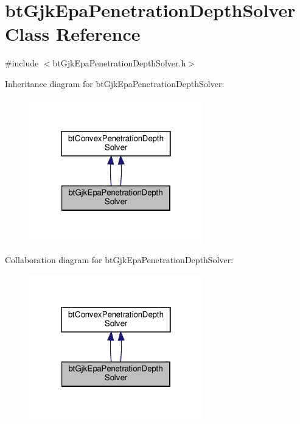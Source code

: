 \hypertarget{classbtGjkEpaPenetrationDepthSolver}{}\section{bt\+Gjk\+Epa\+Penetration\+Depth\+Solver Class Reference}
\label{classbtGjkEpaPenetrationDepthSolver}


{\ttfamily \#include $<$bt\+Gjk\+Epa\+Penetration\+Depth\+Solver.\+h$>$}



Inheritance diagram for bt\+Gjk\+Epa\+Penetration\+Depth\+Solver\+:
\nopagebreak
\begin{figure}[H]
\begin{center}
\leavevmode
\includegraphics[width=214pt]{classbtGjkEpaPenetrationDepthSolver__inherit__graph}
\end{center}
\end{figure}


Collaboration diagram for bt\+Gjk\+Epa\+Penetration\+Depth\+Solver\+:
\nopagebreak
\begin{figure}[H]
\begin{center}
\leavevmode
\includegraphics[width=214pt]{classbtGjkEpaPenetrationDepthSolver__coll__graph}
\end{center}
\end{figure}
